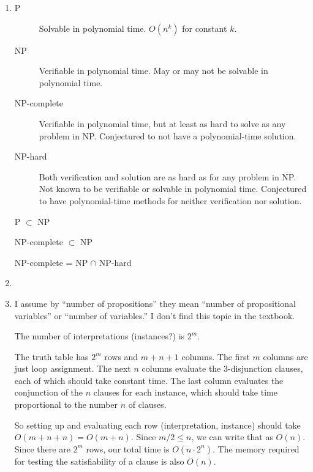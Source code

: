 \begin{enumerate}[label=\alph*.]
	\item
	\begin{description}
		\item [P]  Solvable in polynomial time.  $O(n^k)$ for constant $k$.  
		\item [NP] Verifiable in polynomial time.  May or may not be solvable in polynomial time.  
		\item [NP-complete] Verifiable in polynomial time, but at least as hard to solve as any problem in NP.  Conjectured to not have a polynomial-time solution.  
		\item [NP-hard]  Both verification and solution are as hard as for any problem in NP.   Not known to be verifiable or solvable in polynomial time.  Conjectured to have polynomial-time methods for neither verification nor solution.  
	\end{description}
	
	P $\subset$ NP
	
	NP-complete $\subset$ NP
	
	NP-complete = NP $\cap$ NP-hard
	
	\item \
	

	\item  I assume by ``number of propositions'' they mean ``number of propositional variables'' or ``number of variables.''  I don't find this topic in the textbook.  
	
	The number of interpretations (instances?) is $2^m$.  
	
	The truth table has $2^m$ rows and $m+n+1$ columns.  The first $m$ columns are just loop assignment.  The next $n$ columns evaluate the 3-disjunction clauses, each of which should take constant time.  The last column evaluates the conjunction of the $n$ clauses for each instance, which should take time proportional to the number $n$ of clauses.  
		
	So setting up and evaluating each row (interpretation, instance) should take $O(m+n+n) = O(m+n)$.  Since $m/2 \le n$, we can write that as $O(n)$.  Since there are $2^m$ rows, our total time is $O(n \cdot 2^n)$.  The memory required for testing the satisfiability of a clause is also $O(n)$.  
	

\end{enumerate}
